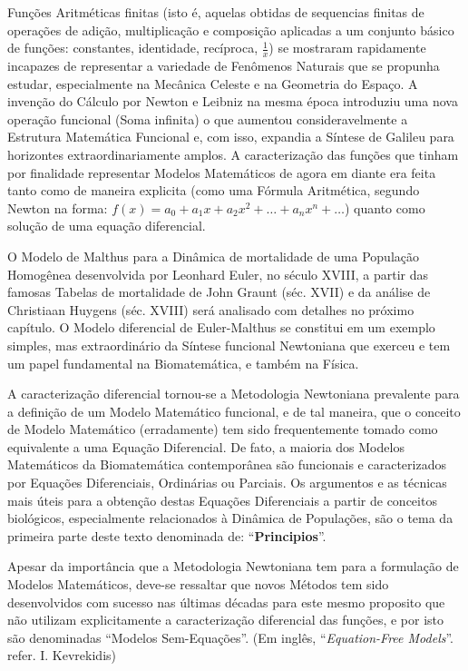     Funções Aritméticas finitas (isto é, aquelas obtidas de sequencias finitas de operações de adição, multiplicação e composição aplicadas a um conjunto básico de funções: constantes, identidade, recíproca, \(\frac{1}{x}\)) se mostraram rapidamente incapazes de representar a variedade de Fenômenos Naturais que se propunha estudar, especialmente na Mecânica Celeste e na Geometria do Espaço. A invenção do Cálculo por Newton e Leibniz na mesma época introduziu uma nova operação funcional (Soma infinita) o que aumentou consideravelmente a Estrutura Matemática Funcional e, com isso, expandia a Síntese de Galileu para horizontes extraordinariamente amplos. A caracterização das funções que tinham por finalidade representar Modelos Matemáticos de agora em diante era feita tanto como de maneira explicita (como uma Fórmula Aritmética, segundo Newton na forma:
    \(f(x) = a_0 + a_1x + a_2x^2 + \ldots + a_n x^n + \ldots\)) quanto como solução de uma equação diferencial.

    O Modelo de Malthus para a Dinâmica de mortalidade de uma População Homogênea desenvolvida por Leonhard Euler, no século XVIII, a partir das famosas Tabelas de mortalidade de John Graunt (séc. XVII) e da análise de Christiaan Huygens (séc. XVIII) será analisado com detalhes no próximo capítulo. O Modelo diferencial de Euler-Malthus se constitui em um exemplo simples, mas extraordinário da Síntese funcional Newtoniana que exerceu e tem um papel fundamental na Biomatemática, e também na Física.

    A caracterização diferencial tornou-se a Metodologia Newtoniana prevalente para a definição de um Modelo Matemático funcional, e de tal maneira, que o conceito de Modelo Matemático (erradamente) tem sido frequentemente tomado como equivalente a uma Equação Diferencial. De fato, a maioria dos Modelos Matemáticos da Biomatemática contemporânea são funcionais e caracterizados por Equações Diferenciais, Ordinárias ou Parciais. Os argumentos e as técnicas mais úteis para a obtenção destas Equações Diferenciais a partir de conceitos biológicos, especialmente relacionados à Dinâmica de Populações, são o tema da primeira parte deste texto denominada de: ``\textbf{Principios}''.

    Apesar da importância que a Metodologia Newtoniana tem para a formulação de Modelos Matemáticos, deve-se ressaltar que novos Métodos tem sido desenvolvidos com sucesso nas últimas décadas para este mesmo proposito que não utilizam explicitamente a caracterização diferencial das funções, e por isto são denominadas ``Modelos Sem-Equações''. (Em inglês, ``\textit{Equation-Free Models}''. refer. I. Kevrekidis)


